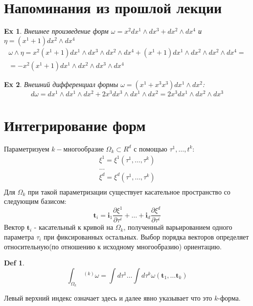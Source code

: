 \documentclass{article}
\newtheorem{defn}{Def}
\newtheorem{example}{Ex}
\begin{document}
 	\section{Напоминания из прошлой лекции}
 	\begin{example} Внешнее произведение форм $\omega = x^2 dx^1 \wedge dx^3 + dx^2 \wedge dx^4$ и $\eta = (x^1+1)dx^2 \wedge dx^4$
 		\begin{multline*}
 		\omega \wedge \eta = x^2 (x^1+1)dx^1 \wedge dx^3 \wedge dx^2 \wedge dx^4 + (x^1+1)dx^1\wedge dx^2 \wedge dx^2 \wedge dx^4 =\\=
 		-x^2(x^1+1) dx^1 \wedge dx^2 \wedge dx^3 \wedge dx^4
 		\end{multline*}
 	\end{example}
 	\begin{example}
 		Внешний дифференциал формы $\omega = (x^1+x^3 x^3) dx^1 \wedge dx^2$:
 		\begin{equation*}
 		d\omega = dx^1 \wedge dx^1 \wedge dx^2 + 2x^3 dx^3\wedge dx^1 \wedge dx^2 = 2x^3 dx^1\wedge dx^2 \wedge dx^3
 		\end{equation*}
 	\end{example}
 	\section{Интегрирование форм}
 	Параметризуем $k-$многообразие $\Omega_k \subset R^d$ с помощью $\tau^1, \dots, t^k:$
 	\begin{gather}
 	\xi^1 = \xi^1(\tau^1, \dots, \tau^k)\\	
 	\dots \\
 	\xi^d = \xi^d(\tau^1, \dots, \tau^k)\\
 	\end{gather}
 	Для $\Omega_k$ при такой параметризации существует касательное пространство со следующим базисом:
 	\begin{equation*}
 	\mathbf{t}_i = \mathbf{i}_1 \frac{\partial \xi^1}{\partial \tau^i} + \dots + \mathbf{i}_d \frac{\partial \xi^d}{\partial \tau^i}
 	\end{equation*}
 	Вектор $\mathbf{t}_i$ - касательный к кривой на $\Omega_k$, полученный варьированием одного параметра $\tau_i$ при фиксированных остальных. Выбор порядка векторов определяет относительную(по отношению к исходному многообразию) ориентацию.
 	\begin{defn}
 		\label{integraldef}
 		\begin{equation}
 		\int_{\Omega_k}  \ ^{(k)} \omega  = \int d \tau^1 \dots \int d \tau^k \omega(\mathbf{t}_1, \dots \mathbf{t}_k)
 		\end{equation}
 	\end{defn}
 	Левый верхний индекс означает здесь и далее явно указывает что это $k$-форма.
 	
\end{document}
